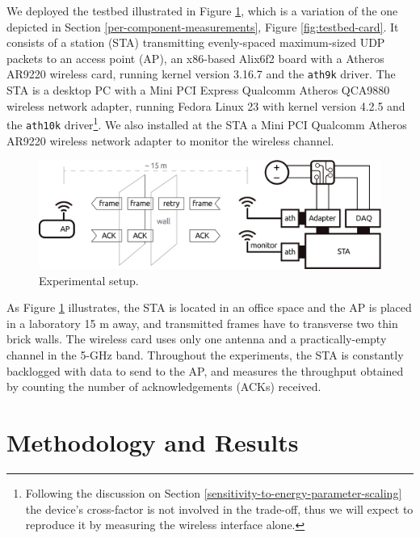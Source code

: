 \documentclass[twoside,nohyper]{tufte-book}
\theoremstyle{definition}
\theoremstyle{definition}
\theoremstyle{definition}
\theoremstyle{remark}
\begin{document}
We deployed the testbed illustrated in Figure \ref{fig:testbedexp},
which is a variation of the one depicted in Section
\ref{per-component-measurements}, Figure \ref{fig:testbed-card}. It
consists of a station (STA) transmitting evenly-spaced maximum-sized UDP
packets to an access point (AP), an x86-based Alix6f2 board with a
Atheros AR9220 wireless card, running kernel version 3.16.7 and the
\texttt{ath9k} driver. The STA is a desktop PC with a Mini PCI Express
Qualcomm Atheros QCA9880 wireless network adapter, running Fedora Linux
23 with kernel version 4.2.5 and the \texttt{ath10k} driver\footnote{Following
  the discussion on Section
  \ref{sensitivity-to-energy-parameter-scaling} the device's
  cross-factor is not involved in the trade-off, thus we will expect to
  reproduce it by measuring the wireless interface alone.}. We also
installed at the STA a Mini PCI Qualcomm Atheros AR9220 wireless network
adapter to monitor the wireless channel.



\begin{figure}

{\centering \includegraphics{img/06/testbed} 

}

\caption[Experimental setup.]{Experimental setup.}\label{fig:testbedexp}
\end{figure}

As Figure \ref{fig:testbedexp} illustrates, the STA is located in an
office space and the AP is placed in a laboratory 15 m away, and
transmitted frames have to transverse two thin brick walls. The wireless
card uses only one antenna and a practically-empty channel in the 5-GHz
band. Throughout the experiments, the STA is constantly backlogged with
data to send to the AP, and measures the throughput obtained by counting
the number of acknowledgements (ACKs) received.

\hypertarget{methodology-and-results}{%
\section{Methodology and Results}\label{methodology-and-results}}
\end{document}
